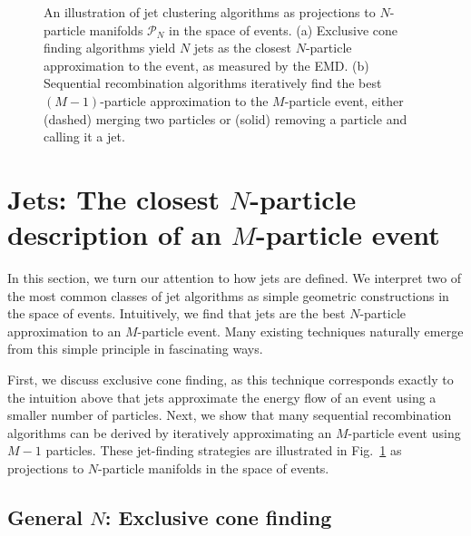 \documentclass[letterpaper,11pt]{article}
\DeclareRobustCommand{\Fig}[1]{Fig.~\ref{#1}}
\begin{document}
\begin{figure}[p]
\centering
{}\hspace{4mm}
\caption{\label{fig:space_jets} An illustration of jet clustering algorithms as projections to $N$-particle manifolds $\mathcal P_N$ in the space of events.
%
(a) Exclusive cone finding algorithms yield $N$ jets as the closest $N$-particle approximation to the event, as measured by the EMD.
%
(b) Sequential recombination algorithms iteratively find the best $(M-1)$-particle approximation to the $M$-particle event, either (dashed) merging two particles or (solid) removing a particle and calling it a jet.}
\end{figure}

\pagebreak


\section{Jets: The closest $N$-particle description of an $M$-particle event}
\label{sec:jets}


In this section, we turn our attention to how jets are defined.
%
We interpret two of the most common classes of jet algorithms as simple geometric constructions in the space of events.
%
Intuitively, we find that jets are the best $N$-particle approximation to an $M$-particle event. 
%
Many existing techniques naturally emerge from this simple principle in fascinating ways.


First, we discuss exclusive cone finding, as this technique corresponds exactly to the intuition above that jets approximate the energy flow of an event using a smaller number of particles.
%
Next, we show that many sequential recombination algorithms can be derived by iteratively approximating an $M$-particle event using $M-1$ particles.
%
These jet-finding strategies are illustrated in \Fig{fig:space_jets} as projections to $N$-particle manifolds in the space of events.




\subsection{General $N$: Exclusive cone finding}
\label{subsec:xcone}
\end{document}
